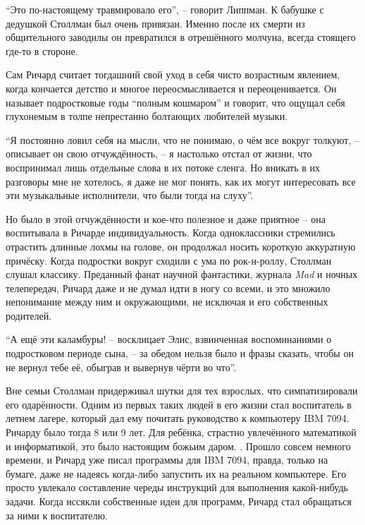 \enquote{Это по-настоящему травмировало его}, -- говорит Липпман. К бабушке с дедушкой Столлман был очень привязан. Именно после их смерти из общительного заводилы он превратился в отрешённого молчуна, всегда стоящего где-то в стороне.

Сам Ричард считает тогдашний свой уход в себя чисто возрастным явлением, когда кончается детство и многое переосмысливается и переоценивается. Он называет подростковые годы \enquote{полным кошмаром} и говорит, что ощущал себя глухонемым в толпе непрестанно болтающих любителей музыки.

\enquote{Я постоянно ловил себя на мысли, что не понимаю, о чём все вокруг толкуют, -- описывает он свою отчуждённость, -- я настолько отстал от жизни, что воспринимал лишь отдельные слова в их потоке сленга. Но вникать в их разговоры мне не хотелось, я даже не мог понять, как их могут интересовать все эти музыкальные исполнители, что были тогда на слуху}.

Но было в этой отчуждённости и кое-что полезное и даже приятное -- она воспитывала в Ричарде индивидуальность. Когда одноклассники стремились отрастить длинные лохмы на голове, он продолжал носить короткую аккуратную причёску. Когда подростки вокруг сходили с ума по рок-н-роллу, Столлман слушал классику. Преданный фанат научной фантастики, журнала \textit{Mad} и ночных телепередач, Ричард даже и не думал идти в ногу со всеми, и это множило непонимание между ним и окружающими, не исключая и его собственных родителей.

\enquote{А ещё эти каламбуры! -- восклицает Элис, взвинченная воспоминаниями о подростковом периоде сына, -- за обедом нельзя было и фразы сказать, чтобы он не вернул тебе её, обыграв и вывернув чёрти во что}.

Вне семьи Столлман придерживал шутки для тех взрослых, что симпатизировали его одарённости. Одним из первых таких людей в его жизни стал воспитатель в летнем лагере, который дал ему почитать руководство к компьютеру IBM 7094. Ричарду было тогда 8 или 9 лет. Для ребёнка, страстно увлечённого математикой и информатикой, это было настоящим божьим даром. . Прошло совсем немного времени, и Ричард уже писал программы для IBM 7094, правда, только на бумаге, даже не надеясь когда-либо запустить их на реальном компьютере. Его просто увлекало составление череды инструкций для выполнения какой-нибудь задачи. Когда иссякли собственные идеи для программ, Ричард стал обращаться за ними к воспитателю.

